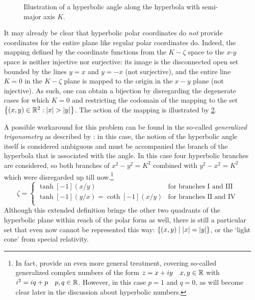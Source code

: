 \begin{figure}[ht!]
    \centering
    
    \caption{Illustration of a hyperbolic angle along the hyperbola with semi-major axis $K$.}
    \label{fig:hyperbolic_angle}
\end{figure}
It may already be clear that hyperbolic polar coordinates do \emph{not} provide coordinates for the entire plane like regular polar coordinates do. Indeed, the mapping defined by the coordinate functions from the $K-\zeta$ space to the $x$-$y$ space is neither injective nor surjective: its image is the disconnected open set bounded by the lines $y = x$ and $y = -x$ (not surjective), and the entire line $K = 0$ in the $K-\zeta$ plane is mapped to the origin in the $x-y$ plane (not injective). As such, one can obtain a bijection by disregarding the degenerate cases for which $K = 0$ and restricting the codomain of the mapping to the set $\qty{(x, y) \in \real^2: \abs{x} > \abs{y}}$. The action of the mapping is illustrated by \cref{fig:polar_coords}.
\begin{figure}[ht]
    \centering
    
    \caption{}
    \label{fig:polar_coords}
\end{figure}

A possible workaround for this problem can be found in the so-called \emph{generalized trigonometry} as described by \citet{Harkin2004}: in this case, the notion of the hyperbolic angle itself is considered ambiguous and must be accompanied the branch of the hyperbola that is associated with the angle. In this case four hyperbolic branches are considered, so both branches of $x^2 - y^2 = K^2$ combined with $y^2 - x^2 = K^2$ which were disregarded up till now.\footnote{In fact, \citeauthor{Harkin2004} provide an even more general treatment, covering so-called generalized complex numbers of the form $z = x + iy\quad x, y \in \mathbb{R}$ with $i^2 = iq + p\quad p, q \in \mathbb{R}$. However, in this case $p = 1$ and $q = 0$, as will become clear later in the discussion about hyperbolic numbers.}
\begin{equation}
    \zeta = 
    \begin{cases}
        \tanh[-1](x/y) & \text{for branches I and III}\\
        \tanh[-1](y/x) = \coth[-1](x/y) & \text{for branches II and IV}\\
    \end{cases}
\end{equation}
Although this extended definition brings the other two quadrants of the hyperbolic plane within reach of the polar form as well, there is still a particular set that even now cannot be represented this way: $\qty{(x, y)\mid \abs{x} = \abs{y}}$, or the `light cone' from special relativity.

